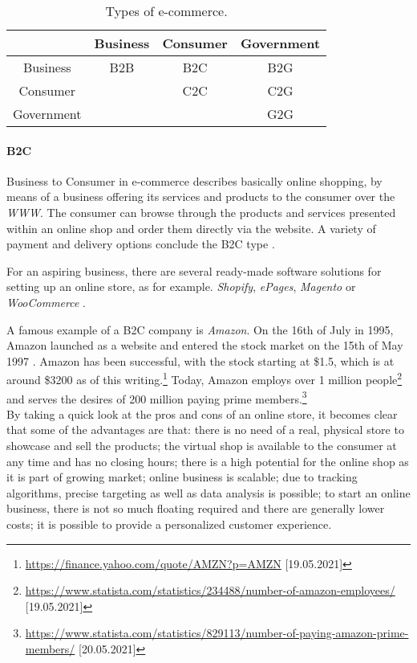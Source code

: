 \begin{table}[h]
	\centering
	\begin{tabular}{| c | c | c | c |}
	\hline
	 & Business & Consumer & Government \\
	\hline
	Business & B2B & B2C & B2G \\
	\hline
	Consumer & \cellcolor{lightgrey} & C2C & C2G \\
	\hline
	Government & \cellcolor{lightgrey} & \cellcolor{lightgrey} & G2G \\
	\hline
	\end{tabular}
	\caption{\label{tab:table-name} Types of e-commerce.}
\end{table}


\paragraph{B2C}
Business to Consumer in e-commerce describes basically online shopping, by means of a business offering its services and products to the consumer over the \textit{WWW}.
The consumer can browse through the products and services presented within an online shop and order them directly via the website.
A variety of payment and delivery options conclude the B2C type \cite{2020Heinemann}.

For an aspiring business, there are several ready-made software solutions for setting up an online store, as for example. \textit{Shopify}, \textit{ePages}, \textit{Magento} or \textit{WooCommerce} \cite{2019Steireif}.

A famous example of a B2C company is \textit{Amazon}.
On the 16th of July in 1995, Amazon launched as a website and entered the stock market on the 15th of May 1997 \cite{2019Stone}. %
Amazon has been successful, with the stock starting at \$1.5, which is at around \$3200 as of this writing.\footnote{\url{https://finance.yahoo.com/quote/AMZN?p=AMZN} [19.05.2021]}
Today, Amazon employs over 1 million people\footnote{\url{https://www.statista.com/statistics/234488/number-of-amazon-employees/} [19.05.2021]} and serves the desires of 200 million paying prime members.\footnote{\url{https://www.statista.com/statistics/829113/number-of-paying-amazon-prime-members/} [20.05.2021]}
\\

By taking a quick look at the pros and cons of an online store, it becomes clear that some of the advantages are that: there is no need of a real, physical store to showcase and sell the products; the virtual shop is available to the consumer at any time and has no closing hours; there is a high potential for the online shop as it is part of growing market; online business is scalable; due to tracking algorithms, precise targeting as well as data analysis is possible; to start an online business, there is not so much floating required and there are generally lower costs; it is possible to provide a personalized customer experience.

